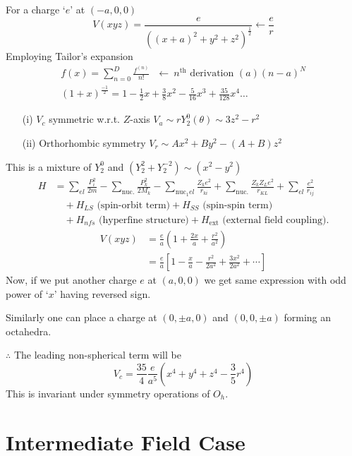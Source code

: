 For a charge `$e$' at $(-a,0,0)$
$$
V(xyz)=\dfrac{e}{((x+a)^{2}+y^{2}+z^{2})^{\frac{1}{2}}}\leftarrow \frac{e}{r}
$$
Employing Tailor's expansion 
\begin{gather*}
f(x)=\sum\limits^{D}_{n=0}\frac{f^{(n)}}{n!}\text{~ $\leftarrow \ n^{\text{th}}$ derivation } (a)(n-a)^{N}\\
(1+x)^{\frac{-1}{2}}=1-\frac{1}{2}x+\frac{3}{8}x^{2}-\frac{5}{16}x^{3}+\frac{35}{128}x^{4}\ldots
\end{gather*}
\begin{itemize}
\item[(i)] $V_{c}$ symmetric w.r.t. $Z$-axis $V_{a}\sim rY^{0}_{2}(\theta)\sim 3z^{2}-r^{2}$

\item[(ii)] Orthorhombic symmetry $V_{r}\sim Ax^{2}+By^{2}-(A+B)z^{2}$
\end{itemize}
This is a mixture of $Y^{0}_{2}$ and $(Y^{2}_{2}+Y^{-2}_{2})\sim (x^{2}-y^{2})$ 
\begin{align*}
H &= \sum\limits_{el}\frac{P^{2}_{i}}{2m}-\sum\limits_{\text{nuc.}}\frac{P^{2}_{k}}{2M_{k}}-\sum\limits_{\text{nuc}_{1}el}\frac{Z_{k}e^{2}}{r_{ki}}+\sum\limits_{\text{nuc.}}\frac{Z_{k}Z_{L}e^{2}}{r_{KL}}+\sum\limits_{el}\frac{e^{2}}{r_{ij}}\\
&\quad +H_{LS}\text{ (spin-orbit term)} + H_{SS}\text{ (spin-spin term)}\\
&\quad +H_{nfs}\text{ (hyperfine structure)}+H_{\text{ext}}\text{ (external field coupling)}.
\end{align*}
\begin{align*}
V(xyz) &= \frac{e}{a}\left(1+\frac{2x}{a}+\frac{r^{2}}{a^{2}}\right)\\
&= \frac{e}{a}\left[1-\frac{x}{a}-\frac{r^{2}}{2a^{2}}+\frac{3x^{2}}{2a^{2}}+\cdots\right]
\end{align*}
Now, if we put another charge $e$ at $(a,0,0)$ we get same expression with odd power of `$x$' having reversed sign.

Similarly one can place a charge at $(0,\pm a,0)$ and $(0,0,\pm a)$ forming an octahedra.

$\therefore$ The leading non-spherical term will be
$$
V_{c}=\frac{35}{4}\frac{e}{a^{5}}\left(x^{4}+y^{4}+z^{4}-\frac{3}{5}r^{4}\right)
$$
This is invariant under symmetry operations of $O_{h}$.

\section{Intermediate Field Case}

